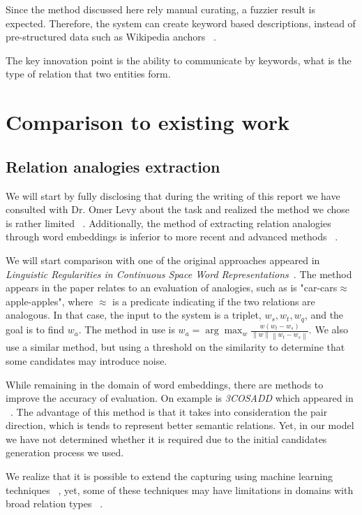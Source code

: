 \documentclass[11pt,a4paper]{article}
\newcommand{\norm}[1]{\left\lVert#1\right\rVert}
\begin{document}
Since the method discussed here rely manual curating, a fuzzier result is expected. Therefore, the system can create keyword based descriptions, instead of pre-structured data such as Wikipedia anchors ~\cite{wang2014knowledge}.

The key innovation point is the ability to communicate by keywords, what is the type of relation that two entities form.

\section{Comparison to existing work}

\subsection{Relation analogies extraction} \label{AE}

We will start by fully disclosing that during the writing of this report we have consulted with Dr. Omer Levy about the task and realized the method we chose is rather limited ~\cite{linzen2016issues}. Additionally, the method of extracting relation analogies through word embeddings is inferior to more recent and advanced methods ~\cite{drozd2016word}.

We will start comparison with one of the original approaches appeared in \textit{Linguistic Regularities in Continuous Space Word Representations}~\cite{mikolov2013linguistic}. The method appears in the paper relates to an evaluation of analogies, such as is "car-cars$\approx$apple-apples", where $\approx$ is a predicate indicating if the two relations are analogous. In that case, the input to the system is a triplet, $w_s,w_t,w_q$, and the goal is to find $w_a$. The method in use is $w_a = \arg \max_w \frac{w \left(w_t-w_s\right)}{\norm{w}\norm{w_t-w_s}}$. We also use a similar method, but using a threshold on the similarity to determine that some candidates may introduce noise.

While remaining in the domain of word embeddings, there are methods to improve the accuracy of evaluation. On example is \textit{3COSADD} which appeared in ~\cite{levy2014linguistic}. The advantage of this method is that it takes into consideration the pair direction, which is tends to represent better semantic relations. Yet, in our model we have not determined whether it is required due to the initial candidates generation process we used.

We realize that it is possible to extend the capturing using machine learning techniques ~\cite{drozd2016word}, yet, some of these techniques may have limitations in domains with broad relation types ~\cite{levy2015supervised}.
\end{document}
